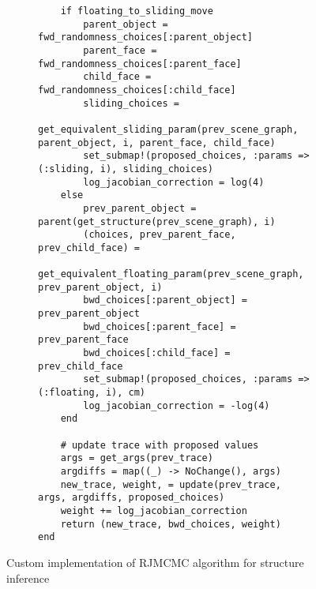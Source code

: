 \begin{figure}[H]
\begin{subfigure}{\textwidth}
\begin{lstlisting}
    if floating_to_sliding_move
        parent_object = fwd_randomness_choices[:parent_object]
        parent_face = fwd_randomness_choices[:parent_face]
        child_face = fwd_randomness_choices[:child_face]
        sliding_choices =
            get_equivalent_sliding_param(prev_scene_graph, parent_object, i, parent_face, child_face)
        set_submap!(proposed_choices, :params => (:sliding, i), sliding_choices)
        log_jacobian_correction = log(4)
    else
        prev_parent_object = parent(get_structure(prev_scene_graph), i)
        (choices, prev_parent_face, prev_child_face) =
            get_equivalent_floating_param(prev_scene_graph, prev_parent_object, i)
        bwd_choices[:parent_object] = prev_parent_object
        bwd_choices[:parent_face] = prev_parent_face
        bwd_choices[:child_face] = prev_child_face
        set_submap!(proposed_choices, :params => (:floating, i), cm)
        log_jacobian_correction = -log(4)
    end

    # update trace with proposed values
    args = get_args(prev_trace)
    argdiffs = map((_) -> NoChange(), args)
    new_trace, weight, = update(prev_trace, args, argdiffs, proposed_choices)
    weight += log_jacobian_correction
    return (new_trace, bwd_choices, weight)
end
\end{lstlisting}
\end{subfigure}

\caption{Custom implementation of RJMCMC algorithm for structure inference}
\label{fig:inference}
\end{figure}

